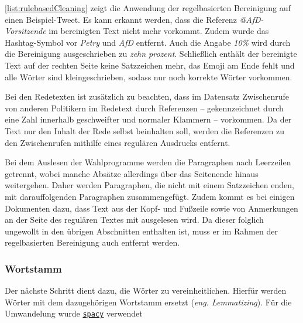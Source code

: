 \autoref{list:rulebasedCleaning} zeigt die Anwendung der regelbasierten Bereinigung auf einen Beispiel-Tweet. Es kann erkannt werden, dass die Referenz \textit{@AfD-Vorsitzende} im bereinigten Text nicht mehr vorkommt. Zudem wurde das Hashtag-Symbol vor \textit{Petry} und \textit{AfD} entfernt. Auch die Angabe \textit{10\%} wird durch die Bereinigung ausgeschrieben zu \textit{zehn prozent}. Schließlich enthält der bereinigte Text auf der rechten Seite keine Satzzeichen mehr, das Emoji am Ende fehlt und alle Wörter sind kleingeschrieben, sodass nur noch korrekte Wörter vorkommen.

Bei den Redetexten ist zusätzlich zu beachten, dass im Datensatz Zwischenrufe von anderen Politikern im Redetext durch Referenzen -- gekennzeichnet durch eine Zahl innerhalb geschweifter und normaler Klammern -- vorkommen. Da der Text nur den Inhalt der Rede selbst beinhalten soll, werden die Referenzen zu den Zwischenrufen mithilfe eines regulären Ausdrucks entfernt.

Bei dem Auslesen der Wahlprogramme werden die Paragraphen nach Leerzeilen getrennt, wobei manche Absätze allerdings über das Seitenende hinaus weitergehen. Daher werden Paragraphen, die nicht mit einem Satzzeichen enden, mit darauffolgenden Paragraphen zusammengefügt. Zudem kommt es bei einigen Dokumenten dazu, dass Text aus der Kopf- und Fußzeile sowie von Anmerkungen an der Seite des regulären Textes mit ausgelesen wird. Da dieser folglich ungewollt in den übrigen Abschnitten enthalten ist, muss er im Rahmen der regelbasierten Bereinigung auch entfernt werden.

\subsubsection{Wortstamm}

Der nächste Schritt dient dazu, die Wörter zu vereinheitlichen. Hierfür werden Wörter mit dem dazugehörigen Wortstamm ersetzt (\textit{eng. Lemmatizing}). Für die Umwandelung wurde \href{https://spacy.io/}{\texttt{spacy}} verwendet


